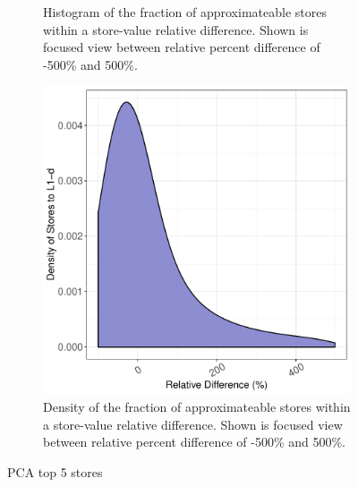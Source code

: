 \begin{figure}[htbp]
\begin{subfigure}{0.33\textwidth}
		\caption{Histogram of the fraction of approximateable stores within a store-value relative difference. Shown is focused view between relative percent difference of -500\% and 500\%.}
	\end{subfigure}
	\begin{subfigure}{0.33\textwidth}
		\centering
		\includegraphics[scale=0.4]{graphs/pca_top5/narrow_dist.pdf}
		\caption{Density of the fraction of approximateable stores within a store-value relative difference. Shown is focused view between relative percent difference of -500\% and 500\%.}
	\end{subfigure}
\caption{PCA top 5 stores} %
\label{fig:pca_valsim_top5}
\end{figure}


